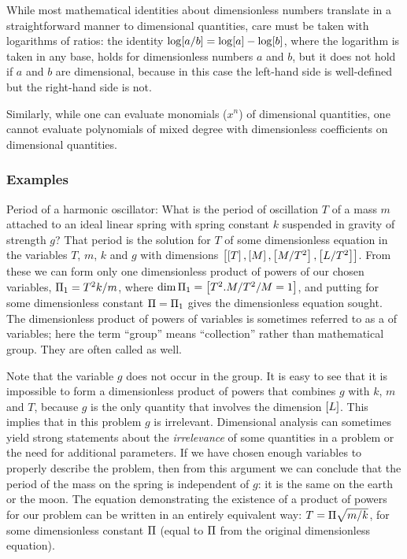 While most mathematical identities about dimensionless numbers translate in a straightforward manner to dimensional quantities, care must be taken with logarithms of ratios: the identity $\log\!\left[{a/b}\right] = \log\!\left[{a}\right] - \log\!\left[{b}\right]$, where the logarithm is taken in any base, holds for dimensionless numbers $a$ and $b$, but it does not hold if $a$ and $b$ are dimensional, because in this case the left-hand side is well-defined but the right-hand side is not.

Similarly, while one can evaluate monomials ($x^n$) of dimensional quantities, one cannot evaluate polynomials of mixed degree with dimensionless coefficients on dimensional quantities.


\subsubsection{Examples}
Period of a harmonic oscillator: What is the period of oscillation $T$ of a mass $m$ attached to an ideal linear spring with spring constant $k$ suspended in gravity of strength $g$? That period is the solution for $T$ of some dimensionless equation in the variables $T$, $m$, $k$ and $g$ with dimensions $\left[{\left[{T}\right], \left[{M}\right], \left[{M/T^2}\right], \left[{L/T^2}\right]}\right]$. From these we can form only one dimensionless product of powers of our chosen variables, $\Pi_1 = T^2 k/m$, where $\dim\Pi_1 = \left[{T^2.M/T^2/M = 1}\right]$, and putting  for some dimensionless constant $\Pi = \Pi_1$ gives the dimensionless equation sought. The dimensionless product of powers of variables is sometimes referred to as a  of variables; here the term ``group'' means ``collection'' rather than mathematical group. They are often called  as well.

Note that the variable $g$ does not occur in the group. It is easy to see that it is impossible to form a dimensionless product of powers that combines $g$ with $k$, $m$ and $T$, because $g$ is the only quantity that involves the dimension $\left[{L}\right]$. This implies that in this problem $g$ is irrelevant. Dimensional analysis can sometimes yield strong statements about the \emph{irrelevance} of some quantities in a problem or the need for additional parameters. If we have chosen enough variables to properly describe the problem, then from this argument we can conclude that the period of the mass on the spring is independent of $g$: it is the same on the earth or the moon. The equation demonstrating the existence of a product of powers for our problem can be written in an entirely equivalent way: $T = \Pi\sqrt{m/k}$, for some dimensionless constant $\Pi$ (equal to $\Pi$ from the original dimensionless equation).

